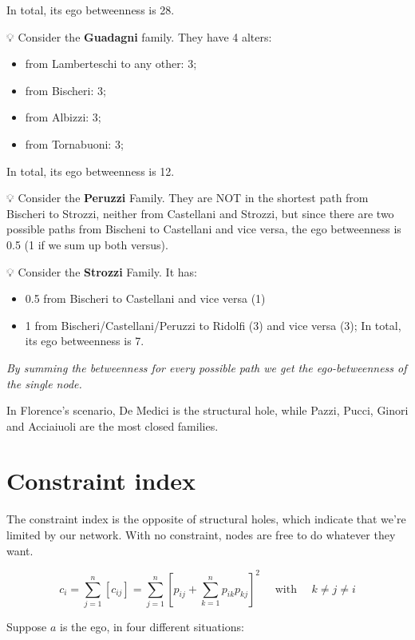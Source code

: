 \documentclass[
  notitlepage,
  onecolumn,
  openany]{book}
\providecommand{\tightlist}{%
  \setlength{\itemsep}{0pt}\setlength{\parskip}{0pt}}
\begin{document}
In total, its ego betweenness is 28.

💡 Consider the \textbf{Guadagni} family. They have 4 alters:

\begin{itemize}
\tightlist
\item
  from Lamberteschi to any other: 3;
\item
  from Bischeri: 3;
\item
  from Albizzi: 3;
\item
  from Tornabuoni: 3;
\end{itemize}

In total, its ego betweenness is 12.

💡 Consider the \textbf{Peruzzi} Family. They are NOT in the shortest path from Bischeri to Strozzi, neither from Castellani and Strozzi, but since there are two possible paths from Bischeni to Castellani and vice versa, the ego betweenness is 0.5 (1 if we sum up both versus).

💡 Consider the \textbf{Strozzi} Family. It has:

\begin{itemize}
\tightlist
\item
  0.5 from Bischeri to Castellani and vice versa (1)
\item
  1 from Bischeri/Castellani/Peruzzi to Ridolfi (3) and vice versa (3);
  In total, its ego betweenness is 7.
\end{itemize}

\emph{By summing the betweenness for every possible path we get the ego-betweenness of the single node.}

In Florence's scenario, De Medici is the structural hole, while Pazzi, Pucci, Ginori and Acciaiuoli are the most closed families.

\hypertarget{constraint-index}{%
\section{Constraint index}\label{constraint-index}}

The constraint index is the opposite of structural holes, which indicate that we're limited by our network. With no constraint, nodes are free to do whatever they want.

\[
c_{i}=\sum_{j=1}^{n}\left[c_{i j}\right]=\sum_{j=1}^{n}\left[p_{i j}+\sum_{k=1}^{n} p_{i k} p_{k j}\right]^{2} \quad \text { with } \quad k \neq j \neq i
\]

Suppose \(a\) is the ego, in four different situations:
\end{document}
